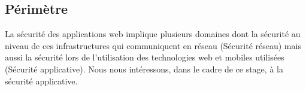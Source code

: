 \subsection{Périmètre}
La sécurité des applications web implique plusieurs domaines dont la sécurité au niveau de ces infrastructures qui communiquent en réseau (Sécurité réseau) mais aussi la sécurité lors de l’utilisation des technologies web et mobiles utilisées (Sécurité applicative). Nous nous intéressons, dans le cadre de ce stage, à la sécurité applicative.

